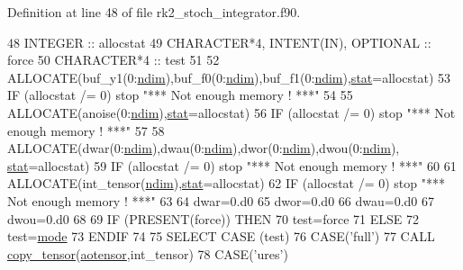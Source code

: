 Definition at line 48 of file rk2\+\_\+stoch\+\_\+integrator.\+f90.


\begin{DoxyCode}
48     \textcolor{keywordtype}{INTEGER} :: allocstat
49     \textcolor{keywordtype}{CHARACTER*4}, \textcolor{keywordtype}{INTENT(IN)}, \textcolor{keywordtype}{OPTIONAL} :: force
50     \textcolor{keywordtype}{CHARACTER*4} :: test
51 
52     \textcolor{keyword}{ALLOCATE}(buf\_y1(0:\hyperlink{namespaceparams_a2323fe1773f086e20c14f266351c482b}{ndim}),buf\_f0(0:\hyperlink{namespaceparams_a2323fe1773f086e20c14f266351c482b}{ndim}),buf\_f1(0:\hyperlink{namespaceparams_a2323fe1773f086e20c14f266351c482b}{ndim}),\hyperlink{namespacestat}{stat}=allocstat)
53     \textcolor{keywordflow}{IF} (allocstat /= 0) stop \textcolor{stringliteral}{"*** Not enough memory ! ***"}
54 
55     \textcolor{keyword}{ALLOCATE}(anoise(0:\hyperlink{namespaceparams_a2323fe1773f086e20c14f266351c482b}{ndim}),\hyperlink{namespacestat}{stat}=allocstat)
56     \textcolor{keywordflow}{IF} (allocstat /= 0) stop \textcolor{stringliteral}{"*** Not enough memory ! ***"}
57 
58     \textcolor{keyword}{ALLOCATE}(dwar(0:\hyperlink{namespaceparams_a2323fe1773f086e20c14f266351c482b}{ndim}),dwau(0:\hyperlink{namespaceparams_a2323fe1773f086e20c14f266351c482b}{ndim}),dwor(0:\hyperlink{namespaceparams_a2323fe1773f086e20c14f266351c482b}{ndim}),dwou(0:\hyperlink{namespaceparams_a2323fe1773f086e20c14f266351c482b}{ndim}),
      \hyperlink{namespacestat}{stat}=allocstat)
59     \textcolor{keywordflow}{IF} (allocstat /= 0) stop \textcolor{stringliteral}{"*** Not enough memory ! ***"}
60 
61     \textcolor{keyword}{ALLOCATE}(int\_tensor(\hyperlink{namespaceparams_a2323fe1773f086e20c14f266351c482b}{ndim}),\hyperlink{namespacestat}{stat}=allocstat)
62     \textcolor{keywordflow}{IF} (allocstat /= 0) stop \textcolor{stringliteral}{"*** Not enough memory ! ***"}
63 
64     dwar=0.d0
65     dwor=0.d0
66     dwau=0.d0
67     dwou=0.d0
68 
69     \textcolor{keywordflow}{IF} (\textcolor{keyword}{PRESENT}(force)) \textcolor{keywordflow}{THEN}
70        test=force
71     \textcolor{keywordflow}{ELSE}
72        test=\hyperlink{namespacestoch__params_a2c3f6439fd2d66413d065b533f2a6263}{mode}
73 \textcolor{keywordflow}{    ENDIF}
74 
75     \textcolor{keywordflow}{SELECT CASE} (test)
76     \textcolor{keywordflow}{CASE}(\textcolor{stringliteral}{'full'})
77        \textcolor{keyword}{CALL }\hyperlink{namespacetensor_a4a88ee8077278486c5128ad97617969e}{copy\_tensor}(\hyperlink{namespaceaotensor__def_a0dc43bc9294a18f2fe57b67489f1702f}{aotensor},int\_tensor)
78     \textcolor{keywordflow}{CASE}(\textcolor{stringliteral}{'ures'})

\end{DoxyCode}
